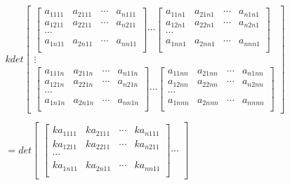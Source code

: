 \documentclass[twoside,a4paper,CCT]{cctart}   %
\begin{document}
\begin{list}{}
{
\setlength{\rightmargin}{\leftmargin}}
\item
\begin{align*}
k det
  \begin{bmatrix}
  \begin{bmatrix}
 a_{1111}& a_{2111}&\cdots&a_{n111}\\
 a_{1211}& a_{2211}&\cdots&a_{n211}\\
 \cdots\\
a_{1n11}& a_{2n11}&\cdots&a_{nn11}\\
 \end{bmatrix}
\cdots
\begin{bmatrix}
a_{11n1}& a_{21n1}&\cdots&a_{n1n1}\\
a_{12n1}& a_{22n1}&\cdots&a_{n2n1}\\
 \cdots\\
a_{1nn1}& a_{2nn1}&\cdots&a_{nnn1}\\
\end{bmatrix}\\
\vdots\\
\begin{bmatrix}
a_{111n}& a_{211n}&\cdots&a_{n11n}\\
a_{121n}& a_{221n}&\cdots&a_{n21n}\\
\cdots\\
a_{1n1n}& a_{2n1n}&\cdots&a_{nn1n}\\
\end{bmatrix}
\cdots
\begin{bmatrix}
a_{11nn}& a_{21nn}&\cdots&a_{n1nn}\\
a_{12nn}& a_{22nn}&\cdots&a_{n2nn}\\
\cdots\\
a_{1nnn}& a_{2nnn}&\cdots&a_{nnnn}\\
\end{bmatrix}
\end{bmatrix}\\
\\
=det
  \begin{bmatrix}
  \begin{bmatrix}
 ka_{1111}& ka_{2111}&\cdots&ka_{n111}\\
 ka_{1211}& ka_{2211}&\cdots&ka_{n211}\\
 \cdots\\
ka_{1n11}& ka_{2n11}&\cdots&ka_{nn11}\\
 \end{bmatrix}
\cdots

\end{bmatrix}
\end{align*}
\end{list}
\end{document}
